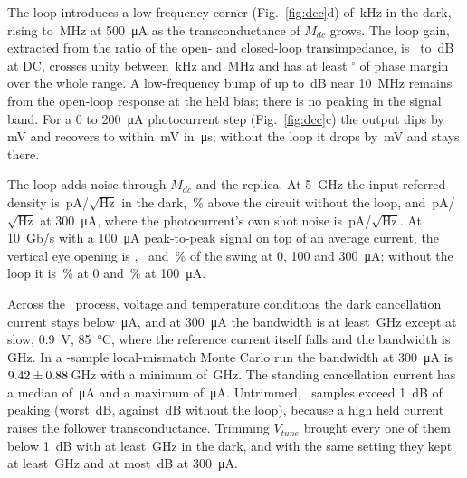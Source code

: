 \documentclass[11pt,a4paper]{article}
\begin{document}
The loop introduces a low-frequency corner (Fig.~\ref{fig:dcc}d) of \DcFloDark\,kHz in the dark, rising to \DcFloMax\,MHz at \SI{500}{\micro A} as the transconductance of $M_{dc}$ grows. The loop gain, extracted from the ratio of the open- and closed-loop transimpedance, is \DcTzMin\ to \DcTzMax\,dB at DC, crosses unity between \DcFuMin\,kHz and \DcFuMax\,MHz and has at least \DcPmMin$^\circ$ of phase margin over the whole range. A low-frequency bump of up to \DcPkLfMax\,dB near \SI{10}{MHz} remains from the open-loop response at the held bias; there is no peaking in the signal band. For a \SI{0}{} to \SI{200}{\micro A} photocurrent step (Fig.~\ref{fig:dcc}c) the output dips by \DcDip\,mV and recovers to within \DcErr\,mV in \DcSettle\,\si{\micro s}; without the loop it drops by \PrDrop\,mV and stays there.

The loop adds noise through $M_{dc}$ and the replica. At \SI{5}{GHz} the input-referred density is \DcInFive\,pA/$\sqrt{\text{Hz}}$ in the dark, \DcNoisePct\,\% above the circuit without the loop, and \DcInFiveThree\,pA/$\sqrt{\text{Hz}}$ at \SI{300}{\micro A}, where the photocurrent's own shot noise is \ShotThree\,pA/$\sqrt{\text{Hz}}$. At \SI{10}{Gb/s} with a \SI{100}{\micro A} peak-to-peak signal on top of an average current, the vertical eye opening is \DcEyeZero, \DcEyeHund\ and \DcEyeThree\,\% of the swing at 0, 100 and \SI{300}{\micro A}; without the loop it is \PrEyeZero\,\% at \SI{0}{} and \PrEyeHund\,\% at \SI{100}{\micro A}.

Across the \DcPvtN\ process, voltage and temperature conditions the dark cancellation current stays below \DcPvtIdccMax\,\si{\micro A}, and at \SI{300}{\micro A} the bandwidth is at least \DcPvtBwMinB\,GHz except at slow, \SI{0.9}{V}, \SI{85}{\celsius}, where the reference current itself falls and the bandwidth is \DcPvtBwMin\,GHz. In a \DcMcN-sample local-mismatch Monte Carlo run the bandwidth at \SI{300}{\micro A} is $9.42\pm0.88$\,GHz with a minimum of \DcMcBwMin\,GHz. The standing cancellation current has a median of \DcMcIdccMed\,\si{\micro A} and a maximum of \DcMcIdccMax\,\si{\micro A}. Untrimmed, \DcMcPkN\ samples exceed \SI{1}{dB} of peaking (worst \DcMcPkMax\,dB, against \DcMcPrPkMax\,dB without the loop), because a high held current raises the follower transconductance. Trimming $V_{tune}$ brought every one of them below \SI{1}{dB} with at least \DcTrBwMin\,GHz in the dark, and with the same setting they kept at least \DcTrBwThree\,GHz and at most \DcTrPkThree\,dB at \SI{300}{\micro A}.
\end{document}
